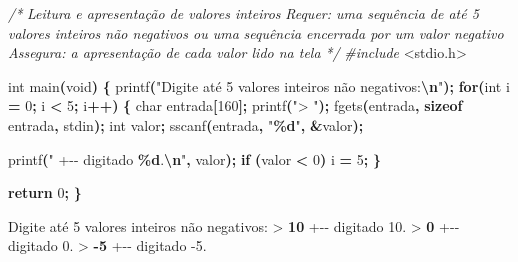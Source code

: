 \documentclass[
  11pt,
  a4paper,
]{scrbook}
\newenvironment{Shaded}{\begin{snugshade}}{\end{snugshade}}
\newcommand{\CommentTok}[1]{\textcolor[rgb]{0.56,0.35,0.01}{\textit{#1}}}
\newcommand{\ControlFlowTok}[1]{\textcolor[rgb]{0.13,0.29,0.53}{\textbf{#1}}}
\newcommand{\DataTypeTok}[1]{\textcolor[rgb]{0.13,0.29,0.53}{#1}}
\newcommand{\DecValTok}[1]{\textcolor[rgb]{0.00,0.00,0.81}{#1}}
\newcommand{\ImportTok}[1]{#1}
\newcommand{\KeywordTok}[1]{\textcolor[rgb]{0.13,0.29,0.53}{\textbf{#1}}}
\newcommand{\NormalTok}[1]{#1}
\newcommand{\OperatorTok}[1]{\textcolor[rgb]{0.81,0.36,0.00}{\textbf{#1}}}
\newcommand{\PreprocessorTok}[1]{\textcolor[rgb]{0.56,0.35,0.01}{\textit{#1}}}
\newcommand{\SpecialCharTok}[1]{\textcolor[rgb]{0.81,0.36,0.00}{\textbf{#1}}}
\newcommand{\StringTok}[1]{\textcolor[rgb]{0.31,0.60,0.02}{#1}}
\begin{document}
\begin{Shaded}
\begin{Highlighting}[]
\CommentTok{/*}
\CommentTok{Leitura e apresentação de valores inteiros}
\CommentTok{Requer: uma sequência de até 5 valores inteiros não negativos ou uma}
\CommentTok{    sequência encerrada por um valor negativo}
\CommentTok{Assegura: a apresentação de cada valor lido na tela}
\CommentTok{*/}
\PreprocessorTok{\#include }\ImportTok{\textless{}stdio.h\textgreater{}}

\DataTypeTok{int}\NormalTok{ main}\OperatorTok{(}\DataTypeTok{void}\OperatorTok{)} \OperatorTok{\{}
\NormalTok{    printf}\OperatorTok{(}\StringTok{"Digite até 5 valores inteiros não negativos:}\SpecialCharTok{\textbackslash{}n}\StringTok{"}\OperatorTok{);}
    \ControlFlowTok{for}\OperatorTok{(}\DataTypeTok{int}\NormalTok{ i }\OperatorTok{=} \DecValTok{0}\OperatorTok{;}\NormalTok{ i }\OperatorTok{\textless{}} \DecValTok{5}\OperatorTok{;}\NormalTok{ i}\OperatorTok{++)} \OperatorTok{\{}
        \DataTypeTok{char}\NormalTok{ entrada}\OperatorTok{[}\DecValTok{160}\OperatorTok{];}
\NormalTok{        printf}\OperatorTok{(}\StringTok{"\textgreater{} "}\OperatorTok{);}
\NormalTok{        fgets}\OperatorTok{(}\NormalTok{entrada}\OperatorTok{,} \KeywordTok{sizeof}\NormalTok{ entrada}\OperatorTok{,}\NormalTok{ stdin}\OperatorTok{);}
        \DataTypeTok{int}\NormalTok{ valor}\OperatorTok{;}
\NormalTok{        sscanf}\OperatorTok{(}\NormalTok{entrada}\OperatorTok{,} \StringTok{"}\SpecialCharTok{\%d}\StringTok{"}\OperatorTok{,} \OperatorTok{\&}\NormalTok{valor}\OperatorTok{);}

\NormalTok{        printf}\OperatorTok{(}\StringTok{"  +{-}{-} digitado }\SpecialCharTok{\%d}\StringTok{.}\SpecialCharTok{\textbackslash{}n}\StringTok{"}\OperatorTok{,}\NormalTok{ valor}\OperatorTok{);}
        \ControlFlowTok{if} \OperatorTok{(}\NormalTok{valor }\OperatorTok{\textless{}} \DecValTok{0}\OperatorTok{)}
\NormalTok{            i }\OperatorTok{=} \DecValTok{5}\OperatorTok{;}
    \OperatorTok{\}}

    \ControlFlowTok{return} \DecValTok{0}\OperatorTok{;}
\OperatorTok{\}}
\end{Highlighting}
\end{Shaded}

\begin{Shaded}
\begin{Highlighting}[]
\NormalTok{Digite até 5 valores inteiros não negativos:}
\NormalTok{\textgreater{} }\KeywordTok{ 10 }
\NormalTok{  +{-}{-} digitado 10.}
\NormalTok{\textgreater{} }\KeywordTok{ 0 }
\NormalTok{  +{-}{-} digitado 0.}
\NormalTok{\textgreater{} }\KeywordTok{ {-}5 }
\NormalTok{  +{-}{-} digitado {-}5.}
\end{Highlighting}
\end{Shaded}
\end{document}
